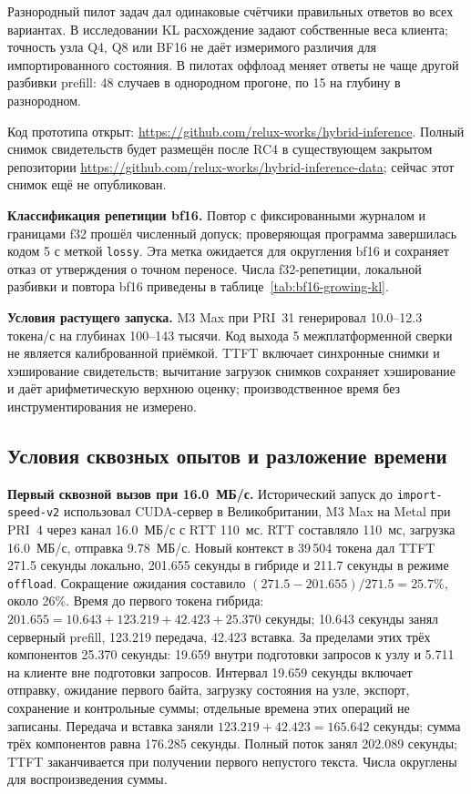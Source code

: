 Разнородный пилот задач дал одинаковые счётчики правильных ответов во всех вариантах.
В исследовании KL расхождение задают собственные веса клиента; точность узла Q4, Q8 или BF16
не даёт измеримого различия для импортированного состояния.
В пилотах оффлоад меняет ответы не чаще другой разбивки prefill: 48 случаев в однородном прогоне, по 15 на глубину в разнородном.

Код прототипа открыт: \url{https://github.com/relux-works/hybrid-inference}.
Полный снимок свидетельств будет размещён после RC4 в существующем закрытом репозитории
\url{https://github.com/relux-works/hybrid-inference-data}; сейчас этот снимок ещё не опубликован.

\textbf{Классификация репетиции bf16.} Повтор с фиксированными журналом и границами f32
прошёл численный допуск; проверяющая программа завершилась кодом 5 с меткой \texttt{lossy}.
Эта метка ожидается для округления bf16 и сохраняет отказ от утверждения о точном переносе.
Числа f32-репетиции, локальной разбивки и повтора bf16 приведены в таблице~\ref{tab:bf16-growing-kl}.

\textbf{Условия растущего запуска.} M3 Max при PRI~31 генерировал 10.0--12.3 токена/с на глубинах 100--143 тысячи. Код выхода 5 межплатформенной сверки не является калиброванной приёмкой. TTFT включает синхронные снимки и хэширование свидетельств; вычитание загрузок снимков сохраняет хэширование и даёт арифметическую верхнюю оценку; производственное время без инструментирования не измерено.

\subsection{Условия сквозных опытов и разложение времени}
\label{app:e2e-methods}

\textbf{Первый сквозной вызов при 16.0~МБ/с.} Исторический запуск до \texttt{import-speed-v2}
использовал CUDA-сервер в Великобритании, M3 Max на Metal при PRI~4 через канал 16.0~МБ/с с RTT 110~мс.
RTT составляло 110~мс, загрузка 16.0~МБ/с, отправка 9.78~МБ/с. Новый контекст в 39\,504 токена
дал TTFT 271.5 секунды локально, 201.655 секунды в гибриде и 211.7 секунды в режиме \texttt{offload}.
Сокращение ожидания составило $(271.5-201.655)/271.5=25.7\%$, около 26\%.
Время до первого токена гибрида: $201.655=10.643+123.219+42.423+25.370$ секунды;
10.643 секунды занял серверный prefill, 123.219 передача, 42.423 вставка.
За пределами этих трёх компонентов 25.370 секунды: 19.659 внутри подготовки запросов к узлу
и 5.711 на клиенте вне подготовки запросов. Интервал 19.659 секунды включает отправку, ожидание первого байта,
загрузку состояния на узле, экспорт, сохранение и контрольные суммы; отдельные времена этих операций не записаны.
Передача и вставка заняли $123.219+42.423=165.642$ секунды;
сумма трёх компонентов равна 176.285 секунды. Полный поток занял 202.089 секунды;
TTFT заканчивается при получении первого непустого текста. Числа округлены для воспроизведения суммы.

